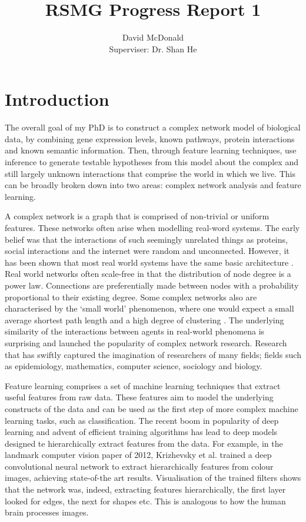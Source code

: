 \documentclass{report}
\title{\Huge \textbf{RSMG Progress Report 1}}
\author{David McDonald \\
	Superviser: Dr. Shan He}
\date{}
\begin{document}
	
	\maketitle
	
	\tableofcontents
	
	
	\chapter{Introduction}
	
	The overall goal of my PhD is to construct a complex network model of biological data, by combining gene expression levels, known pathways, protein interactions and known semantic information. Then, through feature learning techniques, use inference to generate testable hypotheses from this model about the complex and still largely unknown interactions that comprise the world in which we live. This can be broadly broken down into two areas: complex network analysis and feature learning. 
	
	A complex network is a graph that is comprised of non-trivial or uniform features. These networks often arise when modelling real-word systems. The early belief was that the interactions of such seemingly unrelated things as proteins, social interactions and the internet were random and unconnected. However, it has been shown that most real world systems have the same basic architecture \cite{barabasi2009scale}. Real world networks often scale-free in that the distribution of node degree is a power law. Connections are preferentially made between nodes with a probability proportional to their existing degree. Some complex networks also are characterised by the `small world' phenomenon, where one would expect a small average shortest path length and a high degree of clustering \cite{watts1998collective}. The underlying similarity of the interactions between agents in real-world phenomena is surprising and launched the popularity of complex network research. Research that has swiftly captured the imagination of researchers of many fields; fields such as epidemiology, mathematics, computer science, sociology and biology.
	
	Feature learning comprises a set of machine learning techniques that extract useful features from raw data. These features aim to model the underlying constructs of the data and can be used as the first step of more complex machine learning tasks, such as classification. The recent boom in popularity of deep learning and advent of efficient training algorithms has lead to deep models designed te hierarchically extract features from the data. For example, in the landmark computer vision paper of 2012, Krizhevsky et al. \cite{krizhevsky2012imagenet} trained a deep convolutional neural network to extract hierarchically features from colour images, achieving state-of-the art results. Visualisation of the trained filters shows that the network was, indeed, extracting features hierarchically, the first layer looked for edges, the next for shapes etc. This is analogous to how the human brain processes images.
	
\end{document}
